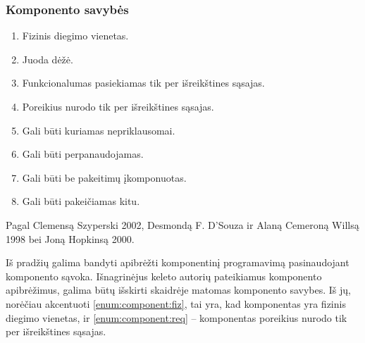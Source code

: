 \begin{frame}
  \frametitle{Komponento savybės}
  \begin{enumerate}
    \item \label{enum:component:fiz} Fizinis diegimo vienetas.
    \item Juoda dėžė.
    \item Funkcionalumas pasiekiamas tik per išreikštines sąsajas.
    \item \label{enum:component:req} Poreikius nurodo tik per
      išreikštines sąsajas.
    \item Gali būti kuriamas nepriklausomai.
    \item Gali būti perpanaudojamas.
    \item Gali būti be pakeitimų įkomponuotas.
    \item Gali būti pakeičiamas kitu.
  \end{enumerate}
  Pagal Clemensą Szyperski 2002, Desmondą F. D'Souza ir Alaną Cemeroną
  Willsą 1998 bei Joną Hopkinsą 2000.
  \begin{handout}
    Iš pradžių galima bandyti apibrėžti komponentinį programavimą
    pasinaudojant komponento sąvoka. Išnagrinėjus keleto autorių
    pateikiamus komponento apibrėžimus, galima būtų išskirti skaidrėje
    matomas  komponento savybes. Iš jų, norėčiau
    akcentuoti \ref{enum:component:fiz}, tai yra, kad komponentas yra
    fizinis diegimo vienetas, ir \ref{enum:component:req} – komponentas
    poreikius nurodo tik per išreikštines sąsajas.
  \end{handout}
\end{frame}

